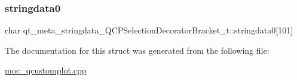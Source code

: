 \subsubsection{\texorpdfstring{stringdata0}{stringdata0}}
{\footnotesize\ttfamily char qt\+\_\+meta\+\_\+stringdata\+\_\+\+Q\+C\+P\+Selection\+Decorator\+Bracket\+\_\+t\+::stringdata0\mbox{[}101\mbox{]}}



The documentation for this struct was generated from the following file\+:\begin{DoxyCompactItemize}
\item 
\mbox{\hyperlink{moc__qcustomplot_8cpp}{moc\+\_\+qcustomplot.\+cpp}}\end{DoxyCompactItemize}
